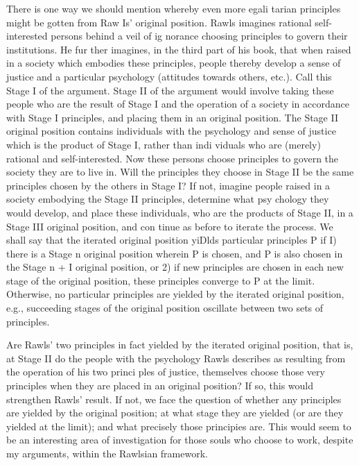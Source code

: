 \documentclass[11pt,openany]{book}
\begin{document}
There is one way we should mention whereby even more egali tarian principles might be gotten from Raw Is' original position. Rawls imagines rational self-interested persons behind a veil of ig norance choosing principles to govern their institutions. He fur ther imagines, in the third part of his book, that when raised in a society which embodies these principles, people thereby develop a sense of justice and a particular psychology (attitudes towards others, etc.). Call this Stage I of the argument. Stage II of the argument would involve taking these people who are the result of Stage I and the operation of a society in accordance with Stage I principles, and placing them in an original position. The Stage II original position contains individuals with the psychology and sense of justice which is the product of Stage I, rather than indi viduals who are (merely) rational and self-interested. Now these persons choose principles to govern the society they are to live in. Will the principles they choose in Stage II be the same principles chosen by the others in Stage I? If not, imagine people raised in a society embodying the Stage II principles, determine what psy chology they would develop, and place these individuals, who are the products of Stage II, in a Stage III original position, and con tinue as before to iterate the process. We shall say that the iterated original position yiDlds particular principles P if I) there is a Stage n original position wherein P is chosen, and P is also chosen in the Stage n + I original position, or 2) if new principles are chosen in each new stage of the original position, these principles converge to P at the limit. Otherwise, no particular principles are yielded by the iterated original position, e.g., succeeding stages of the original position oscillate between two sets of principles. 

Are Rawls' two principles in fact yielded by the iterated original position, that is, at Stage II do the people with the psychology Rawls describes as resulting from the operation of his two princi ples of justice, themselves choose those very principles when they are placed in an original position? If so, this would strengthen Rawls' result. If not, we face the question of whether any principles are yielded by the original position; at what stage they are yielded (or are they yielded at the limit); and what precisely those principies are. This would seem to be an interesting area of investigation for those souls who choose to work, despite my arguments, within the Rawlsian framework. 
\end{document}
